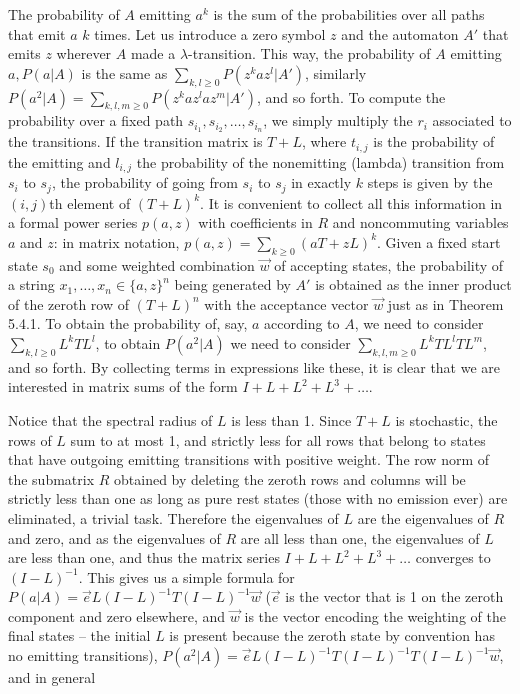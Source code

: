 The probability of $A$ emitting $a^k$ is the sum of the probabilities over all
paths that emit $a$ $k$ times. Let us introduce a zero symbol $z$ and the
automaton $A'$ that emits $z$ wherever $A$ made a $\lambda$-transition. This
way, the probability of $A$ emitting $a, P(a|A)$ is the same as $\sum_{k,l
  \geq 0} P(z^k a z^l | A')$, similarly $P(a^2|A) = \sum_{k,l,m \geq 0} P(z^k
a z^l a z^m | A')$, and so forth. To compute the probability over a fixed path
$s_{i_1}, s_{i_2}, \ldots ,s_{i_n}$, we simply multiply the $r_i$ associated to
the transitions. If the transition matrix is $T+L$, where $t_{i,j}$ is the
probability of the emitting and $l_{i,j}$ the probability of the nonemitting
(lambda) transition from $s_i$ to $s_j$, the probability of going from $s_i$
to $s_j$ in exactly $k$ steps is given by the $(i,j)$th element of $(T+L)^k$.
It is convenient to collect all this information in a formal power series
$p(a,z)$ with coefficients in $R$ and noncommuting variables $a$ and $z$: in
matrix notation, $p(a,z)=\sum_{k \geq 0} (aT+zL)^k$. Given a fixed start state
$s_0$ and some weighted combination $\vec{w}$ of accepting states, the
probability of a string $x_1,\ldots,x_n \in \{a,z\}^n$ being generated by $A'$
is obtained as the inner product of the zeroth row of $(T+L)^n$ with the
acceptance vector $\vec{w}$ just as in Theorem 5.4.1. To obtain the probability
of, say, $a$ according to $A$, we need to consider $\sum_{k,l \geq 0} L^k T
L^l$, to obtain $P(a^2|A)$ we need to consider $\sum_{k,l,m \geq 0} L^k T L^l
T L^m$, and so forth. By collecting terms in expressions like these, it is
clear that we are interested in matrix sums of the form $I+L+L^2+L^3+\ldots$.

Notice that the spectral radius of $L$ is less than 1. Since $T+L$ is
stochastic, the rows of $L$ sum to at most 1, and strictly less for all rows
that belong to states that have outgoing emitting transitions with positive
weight. The row norm of the submatrix $R$ obtained by deleting the zeroth rows
and columns will be strictly less than one as long as pure rest states (those
with no emission ever) are eliminated, a trivial task. Therefore the
eigenvalues of $L$ are the eigenvalues of $R$ and zero, and as the eigenvalues
of $R$ are all less than one, the eigenvalues of $L$ are less than one, and
thus the matrix series $I+L+L^2+L^3+\ldots$ converges to $(I-L)^{-1}$. This
gives us a simple formula for $P(a|A)=\vec{e}L(I-L)^{-1}T(I-L)^{-1}\vec{w}$
($\vec{e}$ is the vector that is 1 on the zeroth component and zero elsewhere,
and $\vec{w}$ is the vector encoding the weighting of the final states -- the
initial $L$ is present because the zeroth state by convention has no emitting
transitions), $P(a^2|A)=\vec{e}L(I-L)^{-1}T(I-L)^{-1}T(I-L)^{-1}\vec{w}$, and
in general

